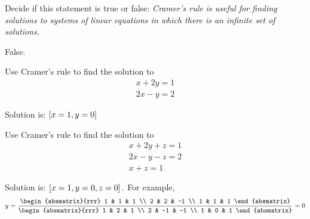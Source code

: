 \begin{enumialphparenastyle}

\begin{ex}Decide if this statement is true or false: \textit{Cramer's rule is useful for finding solutions to systems of linear
equations in which there is an infinite set of solutions.} 
\begin{sol}
False.
\end{sol}
\end{ex}

\begin{ex} Use Cramer's rule to find the solution to 
\begin{equation*}
\begin{array}{c}
x+2y=1 \\
2x-y=2
\end{array}
\end{equation*}
\begin{sol}
Solution is: $\left[x=1,y=0\right] $
\end{sol}
\end{ex}

\begin{ex} Use Cramer's rule to find the solution to 
\begin{equation*}
\begin{array}{c}
x+2y+z=1 \\
2x-y-z=2 \\
x+z=1
\end{array}
\end{equation*}
\begin{sol}
Solution is: $\left[x=1,y=0,z=0\right] .$ For example,
\[
y=\frac{\begin{absmatrix}{rrr}
1 & 1 & 1 \\
2 & 2 & -1 \\
1 & 1 & 1
\end{absmatrix}}{\begin{absmatrix}{rrr}
1 & 2 & 1 \\
2 & -1 & -1 \\
1 & 0 & 1
\end{absmatrix}}=0
\]
\end{sol}
\end{ex}

\end{enumialphparenastyle}